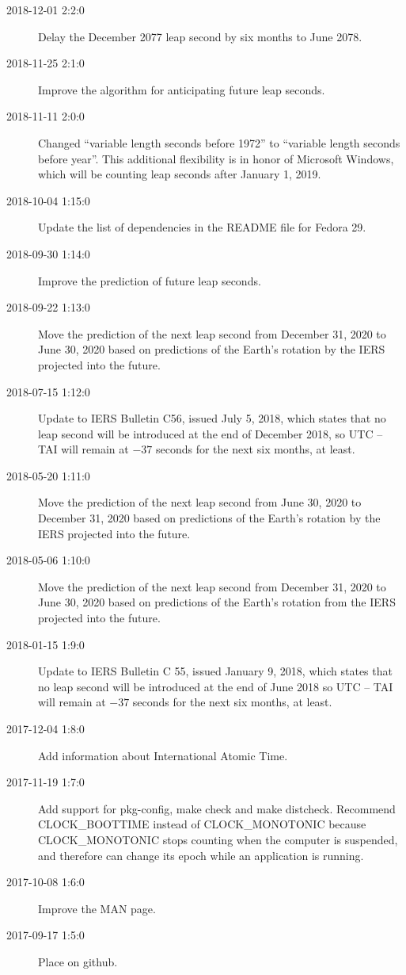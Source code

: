 \documentclass[letterpaper,twoside]{article}
\begin{document}
\begin{description}
\item[2018-12-01 2:2:0] Delay the December 2077 leap second by
  six months to June 2078.
\item[2018-11-25 2:1:0] Improve the algorithm for anticipating future
  leap seconds.
\item[2018-11-11 2:0:0] Changed ``variable length seconds before 1972''
  to ``variable length seconds before year''.  This additional flexibility
  is in honor of Microsoft Windows, which will be counting leap seconds
  after January 1, 2019.
\item[2018-10-04 1:15:0] Update the list of dependencies in the
  README file for Fedora 29.
\item[2018-09-30 1:14:0] Improve the prediction of future leap seconds.
\item[2018-09-22 1:13:0] Move the prediction of the next leap second
  from December 31, 2020 to June 30, 2020 based on predictions of
  the Earth's rotation by the IERS projected into the future.
\item[2018-07-15 1:12:0] Update to IERS Bulletin C56, issued July
  5, 2018, which states that no leap second will be introduced
  at the end of December 2018, so UTC -- TAI will remain at
  $-37$ seconds for the next six months, at least.
\item[2018-05-20 1:11:0] Move the prediction of the next leap second
  from June 30, 2020 to December 31, 2020 based on predictions of
  the Earth's rotation by the IERS projected into the future.
\item[2018-05-06 1:10:0] Move the prediction of the next leap second
  from December 31, 2020 to June 30, 2020 based on predictions
  of the Earth's rotation from the IERS projected into the future.
\item[2018-01-15 1:9:0] Update to IERS Bulletin C 55, issued
  January 9, 2018, which states that no leap second will be introduced
  at the end of June 2018 so UTC -- TAI will remain at $-37$ seconds
  for the next six months, at least.
\item[2017-12-04 1:8:0] Add information about International Atomic Time.
\item[2017-11-19 1:7:0] Add support for pkg-config, make check and
  make distcheck.  Recommend CLOCK\_BOOTTIME instead of CLOCK\_MONOTONIC
  because CLOCK\_MONOTONIC stops counting when the computer is suspended,
  and therefore can change its epoch while an application is running.
\item[2017-10-08 1:6:0] Improve the MAN page.
\item[2017-09-17 1:5:0] Place on github.

\end{description}
\end{document}
